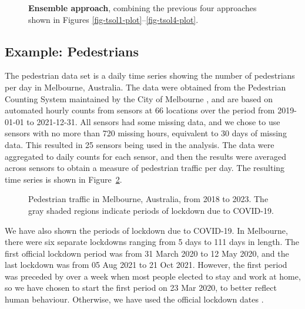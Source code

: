 \documentclass[11pt,a4paper,]{article}
\begin{document}
\begin{figure}[!t]


\caption{\label{fig-tensemble-plot}\textbf{Ensemble approach}, combining
the previous four approaches shown in Figures
\ref{fig-tsol1-plot}--\ref{fig-tsol4-plot}.}

\end{figure}%

\FloatBarrier

\subsection{Example: Pedestrians}\label{example-pedestrians}

The pedestrian data set is a daily time series showing the number of
pedestrians per day in Melbourne, Australia. The data were obtained from
the Pedestrian Counting System maintained by the City of Melbourne
\autocite{pedestrians}, and are based on automated hourly counts from
sensors at 66 locations over the period from 2019-01-01 to 2021-12-31.
All sensors had some missing data, and we chose to use sensors with no
more than 720 missing hours, equivalent to 30 days of missing data. This
resulted in 25 sensors being used in the analysis. The data were
aggregated to daily counts for each sensor, and then the results were
averaged across sensors to obtain a measure of pedestrian traffic per
day. The resulting time series is shown in Figure~\ref{fig-walkers}.

\begin{figure}


\caption{\label{fig-walkers}Pedestrian traffic in Melbourne, Australia,
from 2018 to 2023. The gray shaded regions indicate periods of lockdown
due to COVID-19.}

\end{figure}%

We have also shown the periods of lockdown due to COVID-19. In
Melbourne, there were six separate lockdowns ranging from 5 days to 111
days in length. The first official lockdown period was from 31 March
2020 to 12 May 2020, and the last lockdown was from 05 Aug 2021 to 21
Oct 2021. However, the first period was preceded by over a week when
most people elected to stay and work at home, so we have chosen to start
the first period on 23 Mar 2020, to better reflect human behaviour.
Otherwise, we have used the official lockdown dates
\autocite{MelbourneLockdowns}.
\end{document}

